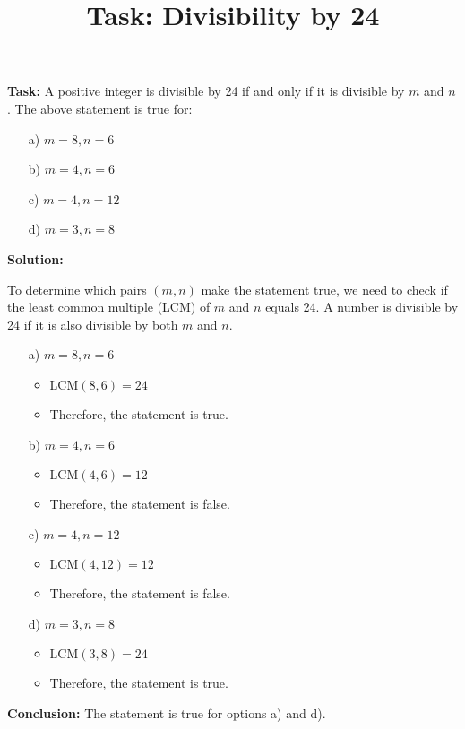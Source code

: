 \documentclass{article}
\title{Task: Divisibility by 24}
\author{}
\date{}
\begin{document}
\maketitle

\textbf{Task:} A positive integer is divisible by 24 if and only if it is divisible by \( m \) and \( n \). The above statement is true for: 
\begin{enumerate}
    \item[a)] \( m = 8, n = 6 \)
    \item[b)] \( m = 4, n = 6 \)
    \item[c)] \( m = 4, n = 12 \)
    \item[d)] \( m = 3, n = 8 \)
\end{enumerate}

\textbf{Solution:}

To determine which pairs \( (m, n) \) make the statement true, we need to check if the least common multiple (LCM) of \( m \) and \( n \) equals 24. A number is divisible by 24 if it is also divisible by both \( m \) and \( n \).

\begin{enumerate}
    \item[a)] \( m = 8, n = 6 \)
    \begin{itemize}
        \item \( \text{LCM}(8, 6) = 24 \)
        \item Therefore, the statement is true.
    \end{itemize}
    
    \item[b)] \( m = 4, n = 6 \)
    \begin{itemize}
        \item \( \text{LCM}(4, 6) = 12 \)
        \item Therefore, the statement is false.
    \end{itemize}
    
    \item[c)] \( m = 4, n = 12 \)
    \begin{itemize}
        \item \( \text{LCM}(4, 12) = 12 \)
        \item Therefore, the statement is false.
    \end{itemize}
    
    \item[d)] \( m = 3, n = 8 \)
    \begin{itemize}
        \item \( \text{LCM}(3, 8) = 24 \)
        \item Therefore, the statement is true.
    \end{itemize}
\end{enumerate}

\textbf{Conclusion:} The statement is true for options a) and d).
\end{document}
